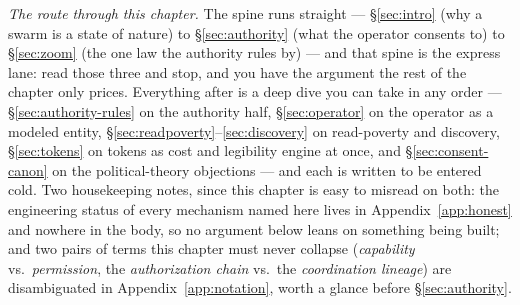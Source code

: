\documentclass[11pt,a4paper]{article}
\theoremstyle{definition}
\theoremstyle{plain}
\begin{document}
\newpage
\tableofcontents
\newpage
\noindent\emph{The route through this chapter.} The spine runs straight ---
\S\ref{sec:intro} (why a swarm is a state of nature) to \S\ref{sec:authority}
(what the operator consents to) to \S\ref{sec:zoom} (the one law the authority
rules by) --- and that spine is the express lane: read those three and stop, and
you have the argument the rest of the chapter only prices. Everything after is a
deep dive you can take in any order --- \S\ref{sec:authority-rules} on the
authority half, \S\ref{sec:operator} on the operator as a modeled entity,
\S\ref{sec:readpoverty}--\ref{sec:discovery} on read-poverty and discovery,
\S\ref{sec:tokens} on tokens as cost and legibility engine at once, and
\S\ref{sec:consent-canon} on the political-theory objections --- and each is
written to be entered cold. Two housekeeping notes, since this chapter is easy to
misread on both: the engineering status of every mechanism named here lives in
Appendix~\ref{app:honest} and nowhere in the body, so no argument below leans on
something being built; and two pairs of terms this chapter must never collapse
(\emph{capability} vs.\ \emph{permission}, the \emph{authorization chain} vs.\ the
\emph{coordination lineage}) are disambiguated in Appendix~\ref{app:notation}, worth a
glance before \S\ref{sec:authority}.
\end{document}
